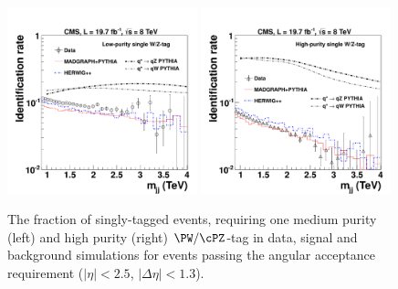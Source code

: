 \begin{figure}[htb]
\begin{center}
\includegraphics[width=0.49\textwidth]{figs/signal-acc-eff/single-tagging-eff-medium.pdf}
\includegraphics[width=0.49\textwidth]{figs/signal-acc-eff/single-tagging-eff.pdf}
\end{center}
\caption{The fraction of singly-tagged events, requiring one medium purity (left) 
  and high purity (right) $\PW/\cPZ$-tag in data,
  signal and background simulations for events passing the angular acceptance
  requirement ($|\eta| < 2.5$, $|\Delta\eta|<1.3$).}
\label{fig:singleefficiencies}
\end{figure}

